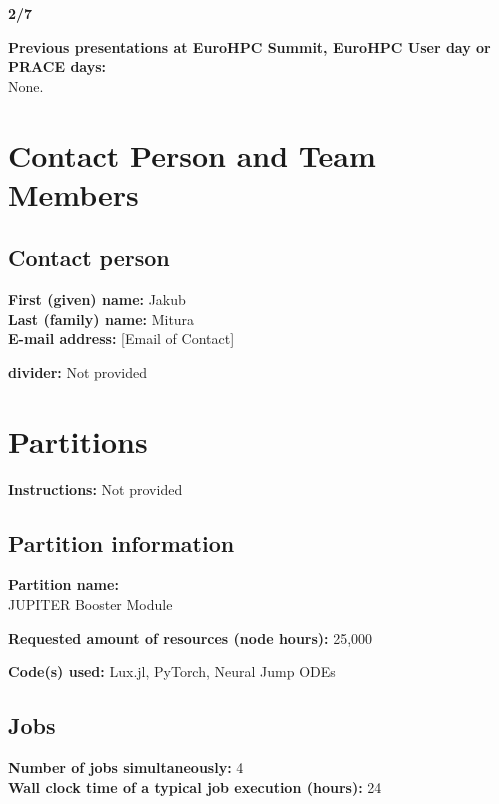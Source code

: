 \documentclass[11pt, a4paper]{article}
\begin{document}
\vspace{0.5em}
\noindent\textbf{2/7}

\vspace{0.5em}
\noindent\textbf{Previous presentations at EuroHPC Summit, EuroHPC User day or PRACE days:} \\
None.

\section*{Contact Person and Team Members}

\subsection*{Contact person}

\noindent\textbf{First (given) name:} Jakub \\
\textbf{Last (family) name:} Mitura \\
\textbf{E-mail address:} [Email of Contact]

\vspace{0.5em}
\noindent\textbf{divider:} Not provided

\section*{Partitions}

\noindent\textbf{Instructions:} Not provided

\subsection*{Partition information}

\noindent\textbf{Partition name:} \\
JUPITER Booster Module

\vspace{0.5em}
\noindent\textbf{Requested amount of resources (node hours):} 25,000

\vspace{0.5em}
\noindent\textbf{Code(s) used:} Lux.jl, PyTorch, Neural Jump ODEs

\subsection*{Jobs}

\noindent\textbf{Number of jobs simultaneously:} 4 \\
\textbf{Wall clock time of a typical job execution (hours):} 24
\end{document}
